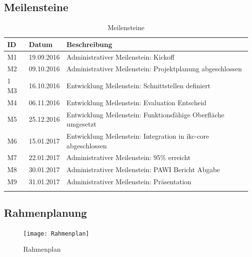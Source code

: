 \newpage
\subsection{Meilensteine}

\begin{longtable}{|p{1cm}|p{2cm}|p{8.5cm}|}
  \hline
    ID & Datum &  Beschreibung \\\hline
    M1 & 19.09.2016 & Administrativer Meilenstein: Kickoff\\\hline
    M2 & 09.10.2016 & Administrativer Meilenstein: Projektplanung abgeschlossen\\\hline1
    M3 & 16.10.2016 & Entwicklung Meilenstein: Schnittstellen definiert\\\hline
    M4 & 06.11.2016 & Entwicklung Meilenstein: Evaluation Entscheid\\\hline
    M5 & 25.12.2016 & Entwicklung Meilenstein: Funktionsfähige Oberfläche umgesetzt\\\hline
    M6 & 15.01.2017 & Entwicklung Meilenstein: Integration in \gls{ikc-core} abgeschlossen\\\hline
    M7 & 22.01.2017 & Administrativer Meilenstein: 95\% erreicht\\\hline
    M8 & 30.01.2017 & Administrativer Meilenstein: PAWI Bericht Abgabe\\\hline
    M9 & 31.01.2017 & Administrativer Meilenstein: Präsentation\\\hline
    \caption{Meilensteine}
  \label{tab:meilensteine}
\end{longtable}
\subsection{Rahmenplanung}
\newpage

\begin{landscape}
\begin{figure}[ht]
\centering
\texttt{[image: Rahmenplan]}
\caption{Rahmenplan}
\label{fig:rahmenplan}
\end{figure}
\end{landscape}

\newpage

